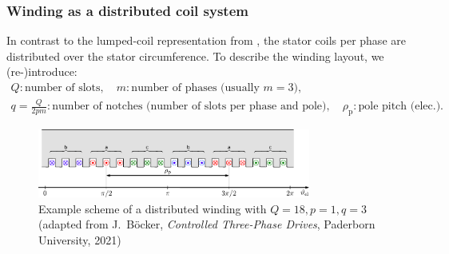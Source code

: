 \begin{frame}
	\frametitle{Winding as a distributed coil system}
    In contrast to the lumped-coil representation from , the stator coils per phase are distributed over the stator circumference. To describe the winding layout, we (re-)introduce:
    \begin{gather*}
		Q: \mbox{number of slots}, \quad m: \mbox{number of phases (usually $m=3$)}, \\ q=\frac{Q}{2 p m}: \mbox{number of notches  (number of slots per phase and pole)}, \quad \rho_\mathrm{p}: \mbox{pole pitch (elec.).}
	\end{gather*}
    \begin{figure}
        \centering
        \includegraphics[width=0.8\textwidth]{fig/lec05/Scheme_distributed_winding.pdf}
        \caption{Example scheme of a distributed winding with $Q=18, p = 1, q=3$ (adapted from J.~B\"ocker, \textit{Controlled Three-Phase Drives}, Paderborn University, 2021)}
        \label{fig:Scheme_distributed_winding}
    \end{figure}
\end{frame}

